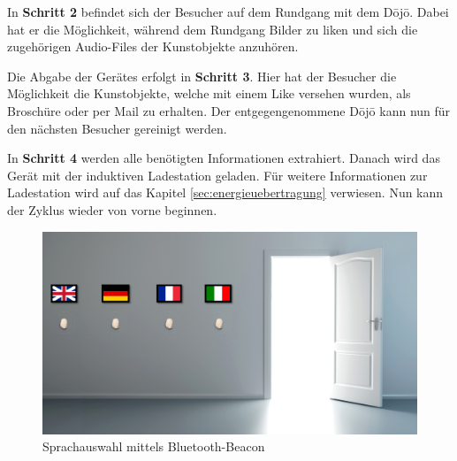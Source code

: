 In \textbf{Schritt 2} befindet sich der Besucher auf dem Rundgang mit dem Dōjō. Dabei hat er die Möglichkeit, während dem Rundgang Bilder zu {\glqq liken\grqq} und sich die zugehörigen Audio-Files der Kunstobjekte anzuhören.

Die Abgabe der Gerätes erfolgt in \textbf{Schritt 3}. Hier hat der Besucher die Möglichkeit die Kunstobjekte, welche mit einem {\glqq Like\grqq} versehen wurden, als Broschüre oder per Mail zu erhalten. Der entgegengenommene Dōjō kann nun für den nächsten Besucher gereinigt werden.

In \textbf{Schritt 4} werden alle benötigten Informationen extrahiert. Danach wird das Gerät mit der induktiven Ladestation geladen. Für weitere Informationen zur Ladestation wird auf das Kapitel \ref{sec:energieuebertragung} verwiesen. Nun kann der Zyklus wieder von vorne beginnen.
\begin{figure}[H]
	\begin{center}
		\includegraphics[width=140mm]{data/BeaconSpracherkennung.png}
		\caption[Sprachauswahl mittels Bluetooth-Beacon]{Sprachauswahl mittels Bluetooth-Beacon} %
		\label{fig:SprachauswahlBeacon}
	\end{center}
\end{figure}